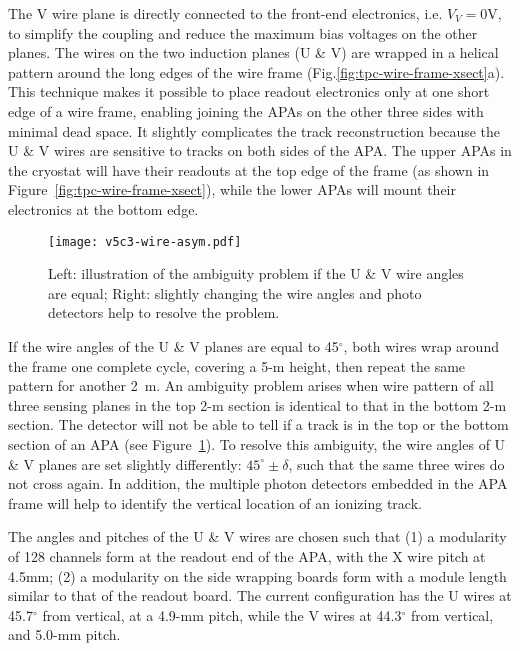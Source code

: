 The V wire plane is directly connected to the front-end electronics, i.e. $V_V=0$V, to simplify the coupling and 
reduce the maximum bias voltages on the other planes. The wires on the two induction planes (U \& V) are wrapped in a helical pattern around the long edges of the wire frame 
(Fig.\ref{fig:tpc-wire-frame-xsect}a). This technique makes it possible to place readout 
electronics only at one short edge of a wire frame, enabling joining the APAs on the other three sides with minimal dead space.  It slightly complicates 
the track reconstruction because the U \& V wires are sensitive to tracks on 
both sides of the APA.  The upper APAs in the cryostat will have their readouts
at the top edge of the frame (as shown in Figure~\ref{fig:tpc-wire-frame-xsect}), 
while the lower APAs will mount their electronics at the bottom edge. 

\begin{figure}[htpb]
\centering
\texttt{[image: v5c3-wire-asym.pdf]}
\caption[Illustration of ambiguity problem if U \& V wire angles are equal]{Left: illustration of the ambiguity problem if the U \& V wire angles are equal; Right: slightly changing the wire angles and photo detectors help to resolve the problem. }
\label{fig:tpc-wire-asymmetry}
\end{figure}

If the wire angles of the U \& V planes are equal to 45$^\circ$, both wires wrap around the frame one complete cycle, covering a 5-m height, then repeat the same pattern for another 2~m.  An ambiguity problem arises when wire pattern of all three sensing planes in the top 2-m section is identical to that in the bottom 2-m section.  The detector will not be able to tell if a track is in the top or the bottom section of an APA (see Figure~\ref{fig:tpc-wire-asymmetry}).  To resolve this ambiguity, the wire angles of U \& V planes are set slightly differently: $45^\circ\pm\delta$, such that the same three wires do not cross again.   In addition, the multiple photon detectors embedded in the APA frame will help to identify the vertical location of an ionizing track.

The angles and pitches of the U \& V wires are chosen such that (1) a modularity of 128 channels form at the readout end of the APA, with the X wire pitch at 4.5mm; (2) a modularity on the side wrapping boards form with a module length similar to that of the readout board.  The current configuration has the U wires at 45.7$^{\circ}$ from vertical, at a 4.9-mm pitch, while the V wires at 44.3$^{\circ}$ from vertical, and 5.0-mm pitch.


